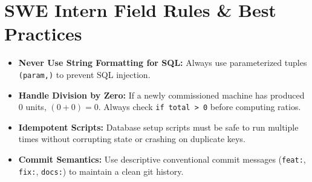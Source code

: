 \documentclass[11pt,letterpaper]{article}
\begin{document}
\section{SWE Intern Field Rules \& Best Practices}

\begin{itemize}[leftmargin=*]
    \item \textbf{Never Use String Formatting for SQL:} Always use parameterized tuples \texttt{(param,)} to prevent SQL injection.
    \item \textbf{Handle Division by Zero:} If a newly commissioned machine has produced 0 units, $(0+0)=0$. Always check \texttt{if total > 0} before computing ratios.
    \item \textbf{Idempotent Scripts:} Database setup scripts must be safe to run multiple times without corrupting state or crashing on duplicate keys.
    \item \textbf{Commit Semantics:} Use descriptive conventional commit messages (\texttt{feat:}, \texttt{fix:}, \texttt{docs:}) to maintain a clean git history.
\end{itemize}
\end{document}
